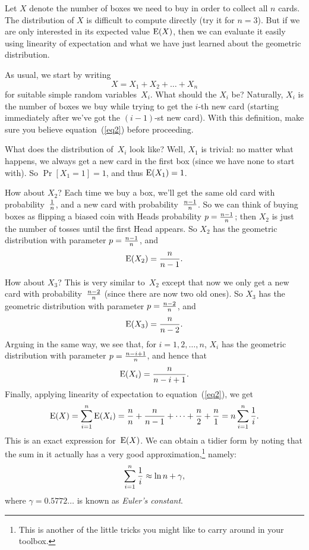 \documentclass[11pt]{article}
\def\Ex#1{{\rm E}(#1)}
\begin{document}
Let $X$ denote the number of boxes we need to buy in order to collect all $n$ cards.
The distribution of $X$ is difficult to compute directly (try it for $n = 3$). But if we are only interested in
its expected value $\Ex{X}$, then we can evaluate it easily using linearity of expectation
and what we have just learned about the geometric distribution.

As usual, we start by writing
\begin{equation}\label{eq2}
   X=X_1+X_2+\ldots+X_n
\end{equation}
for suitable simple random variables~$X_i$.  What should the $X_i$ be?
Naturally, $X_i$ is the number of boxes we buy while trying to get the $i$-th new card
(starting immediately after we've got the $(i-1)$-st new card). With this definition, make sure you
believe equation~(\ref{eq2}) before proceeding.

What does the distribution of~$X_i$ look like?  Well, $X_1$ is trivial:
no matter what happens, we always get a new card in the first box (since
we have none to start with).  So $\Pr[X_1=1]=1$, and thus $\Ex{X_1}=1$.

How about $X_2$?  Each time we buy a box, we'll get the same old card
with probability~$1\over n$, and a new card with probability~${{n-1}\over n}$.
So we can think of buying boxes as flipping a biased coin with Heads
probability $p={{n-1}\over n}$; then $X_2$ is just the number of
tosses until the first Head appears.  So $X_2$ has the geometric
distribution with parameter $p={{n-1}\over n}$, and $$
   \Ex{X_2}={n\over{n-1}}.  $$

How about $X_3$?  This is very similar to~$X_2$ except that now we only
get a new card with probability~${{n-2}\over n}$ (since there are
now two old ones).  So $X_3$ has the geometric distribution with
parameter $p={{n-2}\over n}$, and $$
   \Ex{X_3} = {n\over{n-2}}.  $$
Arguing in the same way, we see that, for $i=1,2,\ldots,n$, $X_i$ has the
geometric distribution with parameter $p={{n-i+1}\over n}$, and hence that $$
   \Ex{X_i} = {n\over{n-i+1}}.  $$
Finally, applying linearity of expectation to equation~(\ref{eq2}), we get
\begin{equation}\label{eq3}
   \Ex{X}=\sum_{i=1}^n\Ex{X_i}={n\over n} + {n\over{n-1}} +\cdots+{n\over 2}+{n\over 1} = n\sum_{i=1}^n{1\over i}.
\end{equation}
This is an exact expression for~$\Ex{X}$.  We can obtain a tidier form
by noting that the sum in it actually has a very good
approximation,\footnote{This is another of the little tricks you might
like to carry around in your toolbox.} namely:$$
   \sum_{i=1}^n{1\over i}\approx\ln n+\gamma, $$
where $\gamma=0.5772\ldots$ is known as {\it Euler's constant}.
\end{document}

